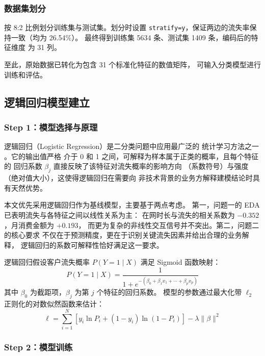 \subsubsection*{数据集划分}

按 8:2 比例划分训练集与测试集。划分时设置
\texttt{stratify=y}，保证两边的流失率保持一致（均为 26.54\%）。
最终得到训练集 5634 条、测试集 1409 条，编码后的特征维度
为 31 列。

至此，原始数据已转化为包含 31 个标准化特征的数值矩阵，
可输入分类模型进行训练和评估。

\subsection{逻辑回归模型建立}

\subsubsection*{Step 1：模型选择与原理}

逻辑回归（Logistic Regression）是二分类问题中应用最广泛的
统计学习方法之一 \cite{li2019statistical}。它的输出值严格
介于 0 和 1 之间，可解释为样本属于正类的概率，且每个特征的
回归系数 $\beta_j$ 直接反映了该特征对流失概率的影响方向
（系数符号）与强度（绝对值大小），这使得逻辑回归在需要向
非技术背景的业务方解释建模结论时具有天然优势。

本文优先采用逻辑回归作为基线模型，主要基于两点考虑。
第一，问题一的 EDA 已表明流失与各特征之间以线性关系为主：
在网时长与流失的相关系数为 $-0.352$，月消费金额为 $+0.193$，
而更为复杂的非线性交互信号并不突出。第二，问题二的核心要求
不仅在于预测精度，更在于识别关键流失因素并给出合理的业务解释，
逻辑回归的系数可解释性恰好满足这一要求。

逻辑回归假设客户流失概率 $P(Y=1 \mid X)$ 满足 Sigmoid 函数映射：
\begin{equation}
    P(Y=1 \mid X)
    = \frac{1}{1 + e^{-(\beta_0 + \beta_1 x_1 + \cdots + \beta_p x_p)}}
    \label{eq:sigmoid}
\end{equation}
其中 $\beta_0$ 为截距项，$\beta_j$ 为第 $j$ 个特征的回归系数。
模型的参数通过最大化带 $\ell_2$ 正则化的对数似然函数来估计：
\begin{equation}
    \ell = \sum_{i=1}^{N} \left[
        y_i \ln P_i + (1 - y_i) \ln (1 - P_i)
    \right] - \lambda \|\beta\|^2
    \label{eq:loglik}
\end{equation}

\subsubsection*{Step 2：模型训练}


